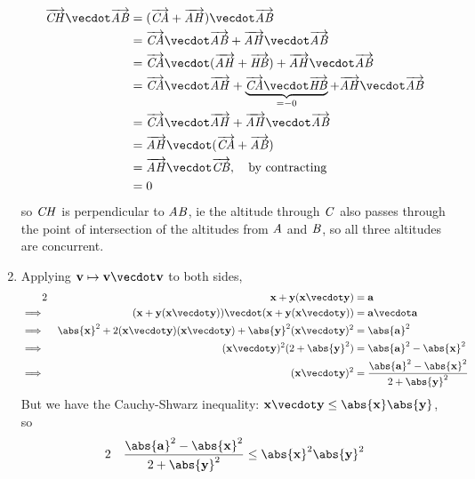 \documentclass[fleqn,a4paper,11pt]{article}
\begin{document}
\begin{enumerate}
    \begin{align*}
     \veca{CH} \vecdot \veca{AB}
      &= (\veca{CA} + \veca{AH}) \vecdot \veca{AB} \\
      &= \veca{CA} \vecdot \veca{AB} + \veca{AH} \vecdot \veca{AB} \\
      &= \veca{CA} \vecdot (\veca{AH} + \veca{HB})
         + \veca{AH} \vecdot \veca{AB} \\
      &= \veca{CA} \vecdot \veca{AH}
         + \underbrace{\veca{CA} \vecdot \veca{HB}}_{= -0}
         + \veca{AH} \vecdot \veca{AB} \\
      &= \veca{CA} \vecdot \veca{AH} + \veca{AH} \vecdot \veca{AB} \\
      &= \veca{AH} \vecdot (\veca{CA} + \veca{AB}) \\
      &= \veca{AH} \vecdot \veca{CB}, \quad \text{by contracting} \\
      &= 0
    \end{align*}
    so \(\mathit{CH}\) is perpendicular to \(\mathit{AB}\), ie the altitude through
    \(\mathit{C}\) also passes through the point of intersection of the altitudes
    from \(\mathit{A}\) and \(\mathit{B}\), so all three altitudes are concurrent.
   \item
    Applying \(\vec v \mapsto \vec v \vecdot \vec v\) to both sides,
    \begin{alignat*}2
     &&  \vec x + \vec y (\vec x \vecdot \vec y) &= \vec a \\
     \implies{}&&
         (\vec x + \vec y (\vec x \vecdot \vec y)) \vecdot
         (\vec x + \vec y (\vec x \vecdot \vec y)) &=
         \vec a \vecdot \vec a \\
     \implies{}&& \abs{\vec x}^2
                  + 2(\vec x \vecdot \vec y)(\vec x \vecdot \vec y)
                  + \abs{\vec y}^2(\vec x \vecdot \vec y)^2 &=
                  \abs{\vec a}^2 \\
     \implies{}&& (\vec x \vecdot \vec y)^2 (2 + \abs{\vec y}^2) &=
                  \abs{\vec a}^2 - \abs{\vec x}^2 \\
     \implies{}&& (\vec x \vecdot \vec y)^2 &=
                  \frac{\abs{\vec a}^2 - \abs{\vec x}^2}{2 + \abs{\vec y}^2}
    \end{alignat*}
    But we have the Cauchy-Shwarz inequality:
    \(\vec x \vecdot \vec y \le \abs{\vec x}\abs{\vec y}\), so
    \begin{alignat*}2
     && \frac{\abs{\vec a}^2 - \abs{\vec x}^2}{2 + \abs{\vec y}^2} &\le
        \abs{\vec x}^2\abs{\vec y}^2 \\

\end{alignat*}
\end{enumerate}
\end{document}
